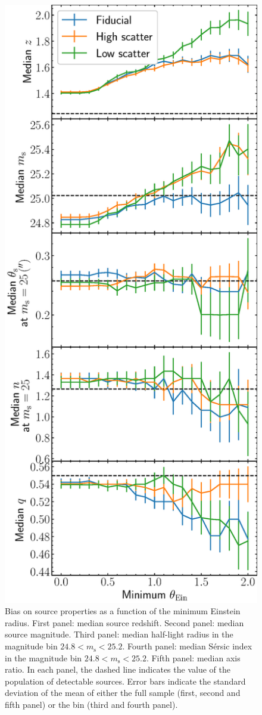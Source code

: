 \documentclass{aa}
\def\msource{m_{\mathrm{s}}}
\begin{document}
\begin{figure}
\includegraphics[width=\columnwidth]{source_bias.eps}
\caption{
Bias on source properties as a function of the minimum Einstein radius.
First panel: median source redshift.
Second panel: median source magnitude.
Third panel: median half-light radius in the magnitude bin $24.8 < \msource < 25.2$.
Fourth panel: median S\'{e}rsic index in the magnitude bin $24.8 < \msource < 25.2$.
Fifth panel: median axis ratio.
In each panel, the dashed line indicates the value of the population of detectable sources.
Error bars indicate the standard deviation of the mean of either the full sample (first, second and fifth panel) or the bin (third and fourth panel).
\label{fig:sourcebias}
}
\end{figure}
\end{document}
